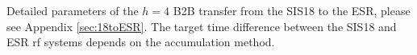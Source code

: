 Detailed parameters of the $h=4$ B2B transfer from the SIS18 to the ESR, please see Appendix \ref{sec:18toESR}.   
The target time difference between the SIS18 and ESR rf systems depends on the accumulation method.


